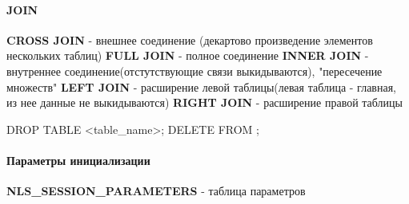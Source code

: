 \documentclass[a5paper,10pt]{article}
\begin{document}
			\paragraph{JOIN}
				\textbf{CROSS JOIN}	- внешнее соединение (декартово произведение элементов нескольких таблиц)
				\textbf{FULL JOIN} - полное соединение
				\textbf{INNER JOIN} - внутреннее соединение(отстутствующие связи выкидываются), "пересечение множеств"
				\textbf{LEFT JOIN} - расширение левой таблицы(левая таблица - главная, из нее данные не выкидываются)
				\textbf{RIGHT JOIN} - расширение правой таблицы

			\begin{lstlistening}
				DROP TABLE <table\_name>;
				DELETE FROM ;
			\end{lstlistening}

			\paragraph{Параметры инициализации}
				\textbf{NLS\_SESSION\_PARAMETERS} - таблица параметров
\end{document}
